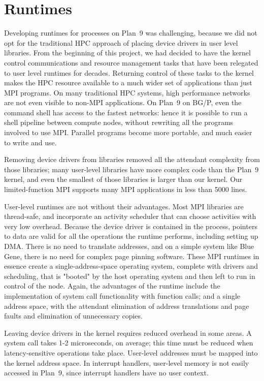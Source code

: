 \chapter{Runtimes}
Developing runtimes for processes on Plan~9 was challenging, because we did not opt for the 
traditional HPC approach of placing device drivers in user level libraries. From the beginning of this 
project, we had decided to have the kernel control communications and  
resource management tasks that have 
been relegated to user level runtimes for decades. Returning control of these tasks to  the kernel
makes the HPC resource available to a much wider set of applications than just MPI programs. On 
many traditional HPC systems, high performance networks are not even visible to non-MPI 
applications. On Plan~9 on BG/P, even the command shell has access to the fastest networks: hence
it is 
possible to run a shell pipeline between compute nodes, without rewriting all the 
programs involved to use MPI. Parallel programs become more portable, and much easier to 
write and use. 

Removing device drivers from libraries removed all the attendant complexity from those libraries; 
many user-level libraries have more complex code than the Plan~9 kernel, and even the smallest 
of those libraries is larger than our kernel. Our limited-function MPI supports many MPI applications 
in less than 5000 lines.

User-level runtimes are not without their advantages. Most MPI libraries are thread-safe, and 
incorporate an activity scheduler that can choose activities with very low overhead. Because the 
device driver is contained in the process, pointers to data are valid for all the operations the runtime 
performs, including setting up DMA. There is no need to translate addresses, and 
on a simple system like Blue Gene, there is no need for complex page pinning software. 
These MPI runtimes in essence create a single-address-space operating system, complete with drivers 
and scheduling, that is "booted" by the host operating system and then left to run in control of the
node. Again, the advantages of the runtime include the implementation  of system call functionality 
with function calls; and a single
address space, with the attendant elimination of address translations and page faults and 
elimination of unnecessary copies. 

Leaving device drivers in the kernel requires reduced overhead in some areas. 
A system call takes 1-2 microseconds, on average; this time must be 
reduced when latency-sensitive operations take place. User-level 
addresses must be mapped into the kernel address space. In interrupt handlers, user-level 
memory is not easily accessed in Plan~9, since interrupt handlers have no user context. 

